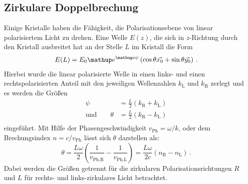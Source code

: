 \subsection{Zirkulare Doppelbrechung} %
\label{sub:doppelbrechung}
Einige Kristalle haben die Fähigkeit, die Polarisationsebene von linear
polarisiertem Licht zu drehen. Eine Welle $E(z)$, die sich in $z$-Richtung
durch den Kristall ausbreitet hat an der Stelle $L$ im Kristall die Form
\begin{equation}
    \label{eqn:energie_final}
    E(L) = E_0\e^{\i\psi}\left(
        \cos\theta\vec{x_0} + \sin\theta\vec{y_0}
    \right)\,.
\end{equation}
Hierbei wurde die linear polarisierte Welle in einen links- und einen
rechtspolarisierten Anteil mit den jeweiligen Wellenzahlen $k_\text{L}$ und
$k_\text{R}$ zerlegt und es werden die Größen
\begin{align*}
    \psi   &= \frac{L}{2}\left(k_\text{R}+k_\text{L}\right)\\
    \text{und}\qquad\theta &= \frac{L}{2}\left(k_\text{R}-k_\text{L}\right)\\
\end{align*}
eingeführt.
Mit Hilfe der Phasengeschwindigkeit $v_\text{Ph} = \omega/k$, oder dem
Brechungsindex $n=c/v_\text{Ph}$ lässt sich $\theta$ darstellen als:
\begin{equation}
    \label{eqn:theta}
    \theta = \frac{L\omega}{2}
    \left(
        \frac{1}{v_\text{Ph,R}} - \frac{1}{v_\text{Ph,L}}
    \right)
    = \frac{L\omega}{2c}\left(n_\text{R}-n_\text{L}\right)\,.
\end{equation}
Dabei werden die Größen getrennt für die zirkularen Polarisationsrichtungen
$R$ und $L$ für rechts- und links-zirkulares Licht betrachtet.

